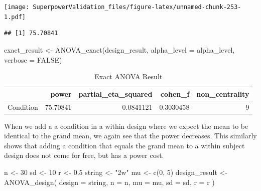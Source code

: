 \documentclass[
]{book}
\newenvironment{Shaded}{\begin{snugshade}}{\end{snugshade}}
\newcommand{\AttributeTok}[1]{\textcolor[rgb]{0.77,0.63,0.00}{#1}}
\newcommand{\ConstantTok}[1]{\textcolor[rgb]{0.00,0.00,0.00}{#1}}
\newcommand{\DecValTok}[1]{\textcolor[rgb]{0.00,0.00,0.81}{#1}}
\newcommand{\FloatTok}[1]{\textcolor[rgb]{0.00,0.00,0.81}{#1}}
\newcommand{\FunctionTok}[1]{\textcolor[rgb]{0.00,0.00,0.00}{#1}}
\newcommand{\NormalTok}[1]{#1}
\newcommand{\OtherTok}[1]{\textcolor[rgb]{0.56,0.35,0.01}{#1}}
\newcommand{\SpecialCharTok}[1]{\textcolor[rgb]{0.00,0.00,0.00}{#1}}
\newcommand{\StringTok}[1]{\textcolor[rgb]{0.31,0.60,0.02}{#1}}
\begin{document}
\texttt{[image: SuperpowerValidation\_files/figure-latex/unnamed-chunk-253-1.pdf]}

\begin{Shaded}
\end{Shaded}

\begin{verbatim}
## [1] 75.70841
\end{verbatim}

\begin{Shaded}
\begin{Highlighting}[]
\NormalTok{exact\_result }\OtherTok{\textless{}{-}} \FunctionTok{ANOVA\_exact}\NormalTok{(design\_result,}
                            \AttributeTok{alpha\_level =}\NormalTok{ alpha\_level,}
                            \AttributeTok{verbose =} \ConstantTok{FALSE}\NormalTok{)}
\end{Highlighting}
\end{Shaded}

\begin{table}[!h]

\caption{\label{tab:unnamed-chunk-255}Exact ANOVA Result}
\centering
\begin{tabular}[t]{l|r|r|r|r}
\hline
  & power & partial\_eta\_squared & cohen\_f & non\_centrality\\
\hline
Condition & 75.70841 & 0.0841121 & 0.3030458 & 9\\
\hline
\end{tabular}
\end{table}

When we add a a condition in a within design where we expect the mean to be identical to the grand mean, we again see that the power decreases. This similarly shows that adding a condition that equals the grand mean to a within subject design does not come for free, but has a power cost.

\begin{Shaded}
\begin{Highlighting}[]
\NormalTok{n }\OtherTok{\textless{}{-}} \DecValTok{30}
\NormalTok{sd }\OtherTok{\textless{}{-}} \DecValTok{10}
\NormalTok{r }\OtherTok{\textless{}{-}} \FloatTok{0.5}
\NormalTok{string }\OtherTok{\textless{}{-}} \StringTok{"2w"}
\NormalTok{mu }\OtherTok{\textless{}{-}} \FunctionTok{c}\NormalTok{(}\DecValTok{0}\NormalTok{, }\DecValTok{5}\NormalTok{) }
\NormalTok{design\_result }\OtherTok{\textless{}{-}} \FunctionTok{ANOVA\_design}\NormalTok{(}
  \AttributeTok{design =}\NormalTok{ string,}
  \AttributeTok{n =}\NormalTok{ n,}
  \AttributeTok{mu =}\NormalTok{ mu,}
  \AttributeTok{sd =}\NormalTok{ sd,}
  \AttributeTok{r =}\NormalTok{ r}
\NormalTok{)}
\end{Highlighting}
\end{Shaded}
\end{document}
